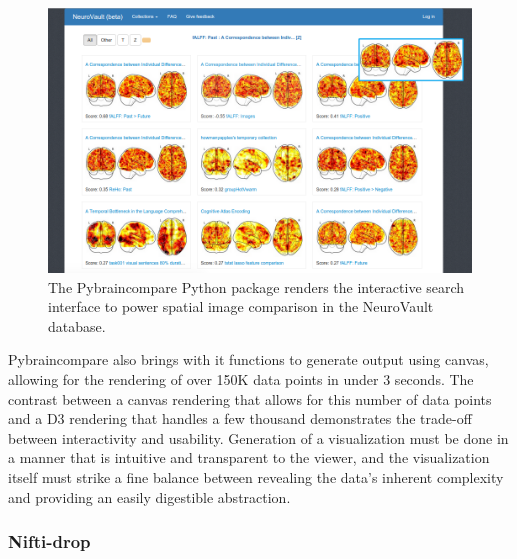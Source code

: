 \documentclass{report}
\begin{document}
\begin{figure}[ht!]
\begin{center}
\includegraphics[width=15cm]{images/figure55.png}
\end{center}
 \caption{\label{fig:55} The Pybraincompare Python package renders the interactive search interface to power spatial image comparison in the NeuroVault database.}
\end{figure}

Pybraincompare also brings with it functions to generate output using
canvas, allowing for the rendering of over 150K data points in under 3
seconds. The contrast between a canvas rendering that allows for this number of data points and a D3 rendering that handles a few thousand demonstrates the trade-off between interactivity and usability. Generation of a visualization must be done in a
manner that is intuitive and transparent to the viewer, and the
visualization itself must strike a fine balance between revealing the
data's inherent complexity and providing an easily digestible
abstraction.

\subsubsection{Nifti-drop}
\end{document}
